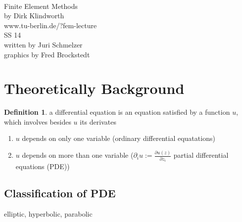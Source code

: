 \documentclass[ngerman]{article}
\theoremstyle{definition}
\newtheorem*{defi}{Definition}
\theoremstyle{remark}
\newcommand{\f}[2]{\frac{#1}{#2}}							%
\newcommand{\p}{\partial}
\begin{document}
\begin{titlepage}
  \begin{center}
    \ \\
    \vspace{03mm}
    {\huge Finite Element Methods\\}
    \vspace{12mm}
    {\Large by Dirk Klindworth}\\
    www.tu-berlin.de/?fem-lecture
    \vspace{12mm}\\
    {\Large  {SS 14\\ }}
    \vspace{15mm}
    {\Large written by Juri Schmelzer  \\
                         graphics by Fred Brockstedt}
  \end{center}
\end{titlepage}
\newpage
\tableofcontents
\newpage
\section{Theoretically Background}
\begin{defi} a differential equation is an equation satisfied by a function $u$, which involves besides $u$ its derivates
  \begin{enumerate}
  \item $u$ depends on only one variable (ordinary differential equatations)
  \item $u$ depends on more than one variable ($\p_i u:= \f{\p u (z)}{\p z_i}$ partial differential equations (PDE))
  \end{enumerate}
\end{defi}
\subsection{Classification of PDE}
elliptic, hyperbolic, parabolic
\end{document}
